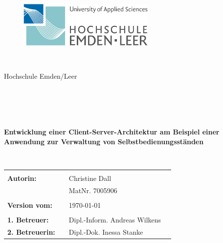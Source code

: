 \thispagestyle{empty}


\begin{figure}[t]
 \centering
 \includegraphics[width=0.6\textwidth]{abb/Allgemeines_Logo_Hochschule_Emden}
\end{figure}


\begin{verbatim}


\end{verbatim}

\begin{center}
\Large{Hochschule Emden/Leer}\\
\end{center}


\begin{center}
\doublespacing
\textbf{\LARGE{\titleDocument}}\\
\singlespacing

\textbf{{~\subjectDocument~}}
\end{center}
\begin{verbatim}

\end{verbatim}
\begin{center}
\end{center}


\begin{center}
{\Large \textbf{Entwicklung einer Client-Server-Architektur
am Beispiel einer Anwendung zur Verwaltung von Selbstbedienungsständen}}
\end{center}

\begin{verbatim}
	
\end{verbatim}
\begin{center}
\end{center}
\begin{flushleft}
\begin{tabular}{llll}

& & \\
\textbf{Autorin:} & & Christine Dall& \\
& & MatNr. 7005906 & \\
& & \\
\textbf{Version vom:} & & \today &\\
& & \\
\textbf{1. Betreuer:} & & Dipl.-Inform. Andreas Wilkens &\\
\textbf{2. Betreuerin:} & & Dipl.-Dok. Inessa Stanke &\\
\end{tabular}
\end{flushleft}

